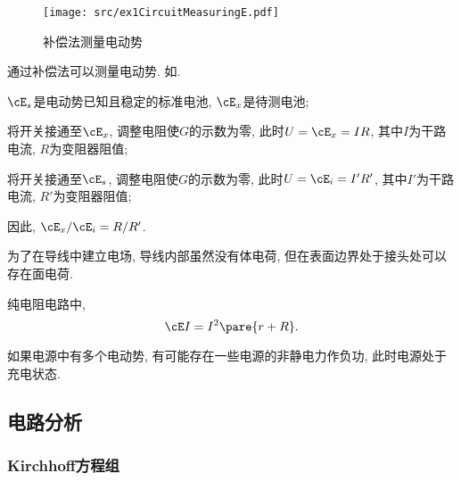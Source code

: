 \documentclass[../Electromagnetism.tex]{subfiles}
\begin{document}
\begin{figure}
	\centering
	\texttt{[image: src/ex1CircuitMeasuringE.pdf]}
	\caption{补偿法测量电动势}
	\label{fig:补偿法测量电动势}
\end{figure}
通过补偿法可以测量电动势. 如.
\begin{cenum}
	\item $\cE_s$是电动势已知且稳定的标准电池, $\cE_x$是待测电池;
	\item 将开关接通至$\cE_x$, 调整电阻使$G$的示数为零, 此时$U=\cE_x=IR$, 其中$I$为干路电流, $R$为变阻器阻值;
	\item 将开关接通至$\cE_s$, 调整电阻使$G$的示数为零, 此时$U=\cE_i=I'R'$, 其中$I'$为干路电流, $R'$为变阻器阻值;
	\item 因此, $\cE_x/\cE_i = R/R'$.
\end{cenum}
\begin{remark}
	为了在导线中建立电场, 导线内部虽然没有体电荷, 但在表面边界处于接头处可以存在面电荷.
\end{remark}
\begin{corollary}[直流电路的能量转换]
	纯电阻电路中,
	\[ \cE I = I^2 \pare{r+R}. \]
\end{corollary}
\begin{remark}
	如果电源中有多个电动势, 有可能存在一些电源的非静电力作负功, 此时电源处于充电状态.
\end{remark}



\subsection{电路分析} %
\label{sub:电路分析}

\subsubsection{Kirchhoff方程组} %
\label{ssub:kirchhoff方程组}
\end{document}
